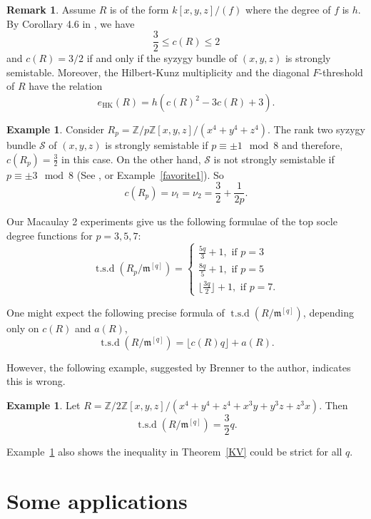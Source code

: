 \documentclass[draft]{amsart}
\theoremstyle{definition}
\newtheorem{example}[theorem]{Example}
\newtheorem{remark}[theorem]{Remark}
\numberwithin{equation}{theorem}
\begin{document}
\begin{remark}
Assume $R$ is of the form $k[x,y,z]/(f)$ where the degree of $f$ is $h$. By Corollary 4.6 in \cite{B2}, we have 
\[\frac{3}{2}\leq c(R) \leq 2\]
and $c(R)=3/2$ if and only if the syzygy bundle of $(x,y,z)$ is strongly semistable.
Moreover, the Hilbert-Kunz multiplicity and the diagonal $F$-threshold of $R$ have the relation
\[e_{\text{HK}}(R)=h(c(R)^2-3c(R)+3).\]
\end{remark}

\begin{example}\label{favorite}
Consider $R_p={\mathbb Z}/p{\mathbb Z}[x,y,z]/(x^4+y^4+z^4)$. The rank two syzygy bundle ${\mathcal{S}}$ of $(x,y,z)$ is strongly semistable if $p \equiv \pm 1 \mod 8$ and therefore, $c(R_p)=\frac{3}{2}$ in this case. On the other hand, ${\mathcal{S}}$ is not strongly semistable if $p \equiv \pm 3 \mod 8$ (See \cite[Example 4.1.8]{K}, \cite{B3,M2} or Example~\ref{favorite1}). So
$$
c(R_p)=\nu_t=\nu_2=
\frac{3}{2}+\frac{1}{2p}.$$

Our Macaulay 2 experiments give us the following formulae of the top socle degree functions for $p=3,5,7$:
$$
{\operatorname{t.s.d}}(R_p/{\mathfrak{m}}^{[q]})=
\begin{cases}
\frac{5q}{3}+1, \text{ if } p = 3\\
\frac{8q}{5}+1, \text{ if } p =5\\
\lfloor \frac{3q}{2}\rfloor+1,  \text{ if } p =7.
\end{cases}
$$
\end{example}

One might expect the following precise formula of ${\operatorname{t.s.d}} (R/{\mathfrak{m}}^{[q]})$, depending only on $c(R)$ and $a(R)$,  
\[{\operatorname{t.s.d}} (R/{\mathfrak{m}}^{[q]})=\lfloor c(R)q \rfloor+a(R).\]

However, the following example, suggested by Brenner to the author, indicates this is wrong.
\begin{example}\label{weird}
Let $R={\mathbb Z}/2{\mathbb Z}[x,y,z]/(x^4+y^4+z^4+x^3y+y^3z+z^3x)$. Then
$${\operatorname{t.s.d}}(R/{\mathfrak{m}}^{[q]})=\frac{3}{2}q.$$
\end{example}
Example~\ref{weird} also shows the inequality in Theorem~\ref{KV} could be strict for all $q$.

\section{Some applications}\label{application}
 
\end{document}
